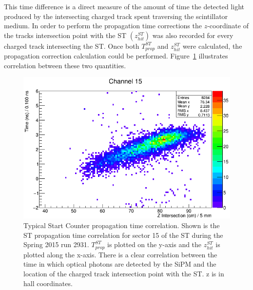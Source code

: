 This time difference is a direct measure of the amount of time the detected light produced by the intersecting charged track spent traversing the scintillator medium.  In order to perform the propagation time corrections the $z$-coordinate of the tracks intersection point with the ST $(z^{ST}_{hit})$ was also recorded for every charged track intersecting the ST.  Once both $T^{ST}_{prop}$ and $z^{ST}_{hit}$ were calculated, the propagation correction calculation could be performed.  Figure~\ref{fig:proptimeuncorr} illustrates correlation between these two quantities.
	\begin{figure}[!htb]
		\centering
		\includegraphics[width=1.0\columnwidth]{calibration/figs/prop_time_uncorr}
		\caption{Typical Start Counter propagation time correlation.  Shown is the ST propagation time correlation for sector 15 of the ST during the Spring 2015 run 2931. $T^{ST}_{prop}$ is plotted on the y-axis and the $z^{ST}_{hit}$ is plotted along the x-axis. There is a clear correlation between the time in which optical photons are detected by the SiPM and the location of the charged track intersection point with the ST.  z is in hall coordinates.}
		\label{fig:proptimeuncorr}
	\end{figure}

